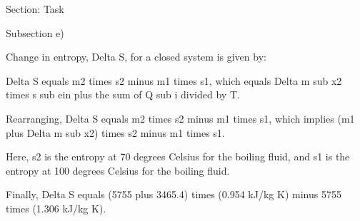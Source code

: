 Section: Task

Subsection e)

Change in entropy, Delta S, for a closed system is given by:

Delta S equals m2 times s2 minus m1 times s1, which equals Delta m sub x2 times s sub ein plus the sum of Q sub i divided by T.

Rearranging, Delta S equals m2 times s2 minus m1 times s1, which implies (m1 plus Delta m sub x2) times s2 minus m1 times s1.

Here, s2 is the entropy at 70 degrees Celsius for the boiling fluid, and s1 is the entropy at 100 degrees Celsius for the boiling fluid.

Finally, Delta S equals (5755 plus 3465.4) times (0.954 kJ/kg K) minus 5755 times (1.306 kJ/kg K).